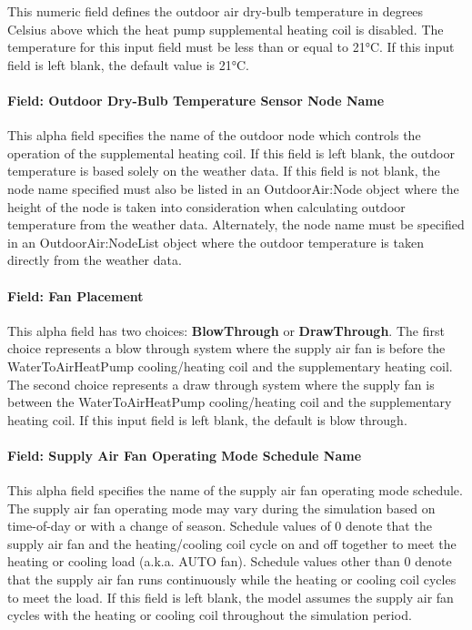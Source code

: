 This numeric field defines the outdoor air dry-bulb temperature in degrees Celsius above which the heat pump supplemental heating coil is disabled. The temperature for this input field must be less than or equal to 21°C. If this input field is left blank, the default value is 21°C.

\paragraph{Field: Outdoor Dry-Bulb Temperature Sensor Node Name}\label{field-outdoor-dry-bulb-temperature-sensor-node-name-1}

This alpha field specifies the name of the outdoor node which controls the operation of the supplemental heating coil. If this field is left blank, the outdoor temperature is based solely on the weather data. If this field is not blank, the node name specified must also be listed in an OutdoorAir:Node object where the height of the node is taken into consideration when calculating outdoor temperature from the weather data. Alternately, the node name must be specified in an OutdoorAir:NodeList object where the outdoor temperature is taken directly from the weather data.

\paragraph{Field: Fan Placement}\label{field-fan-placement-6}

This alpha field has two choices: \textbf{BlowThrough} or \textbf{DrawThrough}. The first choice represents a blow through system where the supply air fan is before the WaterToAirHeatPump cooling/heating coil and the supplementary heating coil. The second choice represents a draw through system where the supply fan is between the WaterToAirHeatPump cooling/heating coil and the supplementary heating coil. If this input field is left blank, the default is blow through.

\paragraph{Field: Supply Air Fan Operating Mode Schedule Name}\label{field-supply-air-fan-operating-mode-schedule-name-2}

This alpha field specifies the name of the supply air fan operating mode schedule. The supply air fan operating mode may vary during the simulation based on time-of-day or with a change of season. Schedule values of 0 denote that the supply air fan and the heating/cooling coil cycle on and off together to meet the heating or cooling load (a.k.a. AUTO fan). Schedule values other than 0 denote that the supply air fan runs continuously while the heating or cooling coil cycles to meet the load. If this field is left blank, the model assumes the supply air fan cycles with the heating or cooling coil throughout the simulation period.

